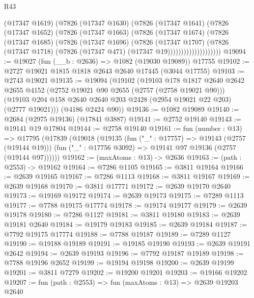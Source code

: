 \begin{lexlean}{R43}
\begin{coremodule}
                      (@17347 @1619)
                      (@7826
                        (@17347 @1630)
                        (@7826
                          (@17347 @1641)
                          (@7826
                            (@17347 @1652)
                            (@7826
                              (@17347 @1663)
                              (@7826
                                (@17347 @1674)
                                (@7826
                                  (@17347 @1685)
                                  (@7826
                                    (@17347 @1696)
                                    (@7826
                                      (@17347 @1707)
                                      (@7826
                                        (@17347 @1718)
                                        (@7826 (@17347 @471) (@17347 @19))))))))))))))))))))
@19094 := @19027 (fun (__b : @2636) => @1082 (@19030 @19089)) @17755
@19102 := @2727 @19021 @1815 @1818 @2643 @2640 @17445 (@3044 @17755)
@19103 := @2743 @19021
@19135 := @19094
    (@19102
      (@19103
        @178
        @1817
        @2640
        @2642
        @2655
        @4152
        (@2752 @19021 @90 @2655 (@2757 (@2758 @19021 @90)))
        (@19103 @204 @158 @2640 @2640 @203 @2428 (@2954 @19021 @22 @203) (@2777 @19021)))
      (@4186 @2424 @90))
@19136 := @1082 @19089
@19140 := @2684 (@2975 @19136) (@17841 @3887)
@19141 := @2752 @19140
@19143 := @19141 @19 @17804
@19144 := @2758 @19140
@19161 := fun (number : @13) =>
  @17795
    (@17839
      (@19018
        (@19135
          (fun ("_" : @17757) => @19143 (@2757 (@19144 @19)))
          (fun ("_" : @17756 @3092) => @19141 @97 @19136 (@2757 (@19144 @97))))))
@19162 := (maxAtoms : @13) -> @2636
@19163 := (path : @2553) -> @19162
@19164 := @7286 @1105
@19165 := @3811 @19164
@19166 := @2639 @19165
@19167 := @7286 @1113
@19168 := @3811 @19167
@19169 := @2639 @19168
@19170 := @3811 @17771
@19172 := @2639 @19170 @2640
@19173 := @19169 @19172
@19174 := @2639 @19173
@19175 := @7289 @1113
@19177 := @7788 @19175 @17774
@19178 := @19174 @19177
@19179 := @2639 @19178
@19180 := @7286 @1127
@19181 := @3811 @19180
@19183 := @2639 @19181 @2640
@19184 := @19179 @19183
@19185 := @2639 @19184
@19187 := @7792 @19175 @17774
@19188 := @7788 @19187
@19189 := @7289 @1127
@19190 := @19188 @19189
@19191 := @19185 @19190
@19193 := @2639 @19191 @2642
@19194 := @2639 @19193
@19196 := @7792 @19187 @19189
@19198 := @7788 @19196 @2652
@19199 := @19194 @19198
@19200 := @2639 @19199
@19201 := @3811 @7279
@19202 := @19200 @19201
@19203 := @19166 @19202
@19207 := fun (path : @2553) => fun (maxAtoms : @13) => @2639 @19203 @2640

\end{coremodule}
\end{lexlean}
